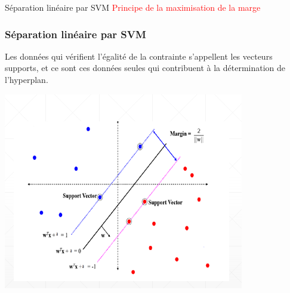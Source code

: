 \documentclass{bredelebeamer}
\begin{document}
 \begin{frame}{Séparation linéaire par SVM}
\textcolor{red}{ Principe de la maximisation de la marge}
 
    \frametitle{Séparation linéaire par SVM }
    \begin{minipage}{0.4\textwidth}
 
        Les données qui vérifient l’égalité de la contrainte s’appellent les vecteurs supports, et ce sont ces données seules qui contribuent à la détermination de l’hyperplan.
    \end{minipage}
    \begin{minipage}{0.4\textwidth}
        \includegraphics[scale=0.6]{12.png}
    \end{minipage}
\end{frame}
\end{document}
